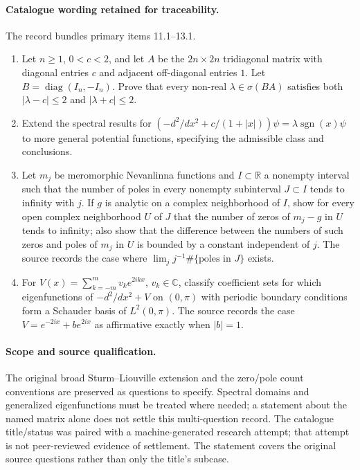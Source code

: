 \documentclass[11pt]{article}
\begin{document}
\paragraph{Catalogue wording retained for traceability.}
The record bundles primary items 11.1--13.1.
\begin{enumerate}
\item Let $n\ge1$, $0<c<2$, and let $A$ be the $2n\times2n$ tridiagonal matrix with diagonal entries $c$ and adjacent off-diagonal entries $1$. Let $B=\operatorname{diag}(I_n,-I_n)$. Prove that every non-real $\lambda\in\sigma(BA)$ satisfies both $|\lambda-c|\le2$ and $|\lambda+c|\le2$.
\item Extend the spectral results for $(-d^2/dx^2+c/(1+|x|))\psi=\lambda\operatorname{sgn}(x)\psi$ to more general potential functions, specifying the admissible class and conclusions.
\item Let $m_j$ be meromorphic Nevanlinna functions and $I\subset\mathbb R$ a nonempty interval such that the number of poles in every nonempty subinterval $J\subset I$ tends to infinity with $j$. If $g$ is analytic on a complex neighborhood of $I$, show for every open complex neighborhood $U$ of $J$ that the number of zeros of $m_j-g$ in $U$ tends to infinity; also show that the difference between the numbers of such zeros and poles of $m_j$ in $U$ is bounded by a constant independent of $j$. The source records the case where $\lim_jj^{-1}\#\{\text{poles in }J\}$ exists.
\item For $V(x)=\sum_{k=-m}^m v_ke^{2ikx}$, $v_k\in\mathbb C$, classify coefficient sets for which eigenfunctions of $-d^2/dx^2+V$ on $(0,\pi)$ with periodic boundary conditions form a Schauder basis of $L^2(0,\pi)$. The source records the case $V=e^{-2ix}+be^{2ix}$ as affirmative exactly when $|b|=1$.
\end{enumerate}
\paragraph{Scope and source qualification.}The original broad Sturm–Liouville extension and the zero/pole count conventions are preserved as questions to specify. Spectral domains and generalized eigenfunctions must be treated where needed; a statement about the named matrix alone does not settle this multi-question record. The catalogue title/status was paired with a machine-generated research attempt; that attempt is not peer-reviewed evidence of settlement. The statement covers the original source questions rather than only the title’s subcase.
\end{document}
